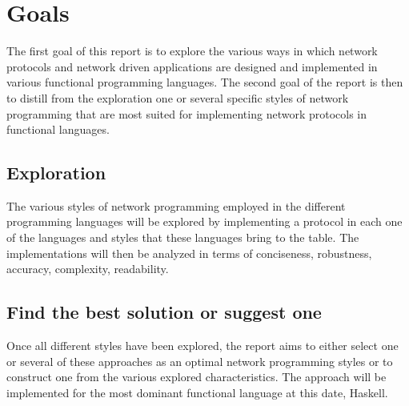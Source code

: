 \chapter{Goals}
The first goal of this report is to explore the various ways in which network protocols and network driven applications are designed and implemented in various functional programming languages. The second goal of the report is then to distill from the exploration one or several specific styles of network programming that are most suited for implementing network protocols in functional languages.

\section{Exploration}
The various styles of network programming employed in the different programming languages will be explored by implementing a protocol in each one of the languages and styles that these languages bring to the table. The implementations will then be analyzed in terms of conciseness, robustness, accuracy, complexity, readability. %

\section{Find the best solution or suggest one}
Once all different styles have been explored, the report aims to either select one or several of these approaches as an optimal network programming styles or to construct one from the various explored characteristics. The approach will be implemented for the most dominant functional language at this date, Haskell. %

